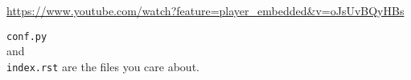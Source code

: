 \documentclass[11pt]{article}
\begin{document}
\href{https://www.youtube.com/watch?feature=player\_embedded\&v=oJsUvBQyHBs}{https://www.youtube.com/watch?feature=player\_embedded\&v=oJsUvBQyHBs}


{\tt conf.py}  \\
and \\
{\tt index.rst} are the files you care about. 
\end{document}
